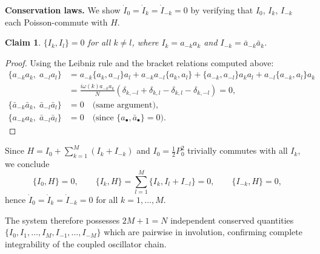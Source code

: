 \documentclass[12pt]{article}
\newcommand{\be}{\begin{equation}}
\newcommand{\ee}{\end{equation}}
\newcommand{\bea}{\begin{aligned}}
\newcommand{\eea}{\end{aligned}}
\theoremstyle{plain}
\newtheorem{claim}{Claim}
\begin{document}
\noindent\textbf{Conservation laws.}
We show $\dot{I}_0 = \dot{I}_k = \dot{I}_{-k} = 0$ by verifying that $I_0$, $I_k$, $I_{-k}$
each Poisson-commute with $H$.

\begin{claim}
$\{I_k, I_l\} = 0$ for all $k \neq l$, where $I_k = a_{-k}a_k$ and $I_{-k} = \bar{a}_{-k}\bar{a}_k$.
\end{claim}
\begin{proof}
Using the Leibniz rule and the bracket relations computed above:
\be\bea
  \{a_{-k}a_k,\; a_{-l}a_l\}
    &= a_{-k}\{a_k, a_{-l}\}a_l + a_{-k}a_{-l}\{a_k, a_l\}
     + \{a_{-k}, a_{-l}\}a_ka_l + a_{-l}\{a_{-k}, a_l\}a_k \\
    &= \frac{i\omega(k)a_{-k}a_k}{N}(\delta_{k,-l} + \delta_{k,l} - \delta_{k,l} - \delta_{k,-l})
     = 0, \\[4pt]
  \{\bar{a}_{-k}\bar{a}_k,\; \bar{a}_{-l}\bar{a}_l\}
    &= 0 \quad \text{(same argument)}, \\[4pt]
  \{a_{-k}a_k,\; \bar{a}_{-l}\bar{a}_l\}
    &= 0 \quad \text{(since $\{a_\bullet, \bar{a}_\bullet\} = 0$)}.
\eea\ee
\end{proof}

\noindent Since $H = I_0 + \sum_{k=1}^M(I_k + I_{-k})$ and $I_0 = \frac{1}{2}P_0^2$ trivially commutes
with all $I_k$, we conclude
\be
  \{I_0, H\} = 0, \qquad
  \{I_k, H\} = \sum_{l=1}^M\{I_k, I_l + I_{-l}\} = 0, \qquad
  \{I_{-k}, H\} = 0,
\ee
hence $\dot{I}_0 = \dot{I}_k = \dot{I}_{-k} = 0$ for all $k = 1, \ldots, M$.

\medskip
\noindent The system therefore possesses $2M + 1 = N$ independent conserved quantities
$\{I_0, I_1, \ldots, I_M, I_{-1}, \ldots, I_{-M}\}$ which are pairwise in involution,
confirming complete integrability of the coupled oscillator chain.
\end{document}
